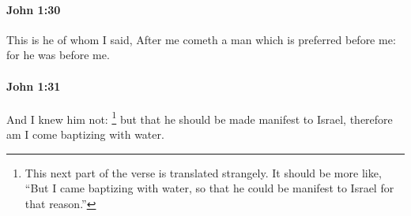 		\paragraph{John 1:30} %
			\label{JOHN-1-30}

			This is he of whom I said, After me cometh a man which is preferred before me: for he was before me.

			\begin{framed}
			\scriptsize
				\begin{compactdesc}
					\item[SBLG] 
				\end{compactdesc}
			\end{framed}

		\paragraph{John 1:31} %
			\label{JOHN-1-31}

			And I knew him not:
				\footnote{%
					This next part of the verse is translated strangely. It should be more like, ``But I came baptizing with water, so that he could be manifest to Israel for that reason.''
					}%
			but that he should be made manifest to Israel, therefore am I come baptizing with water.

